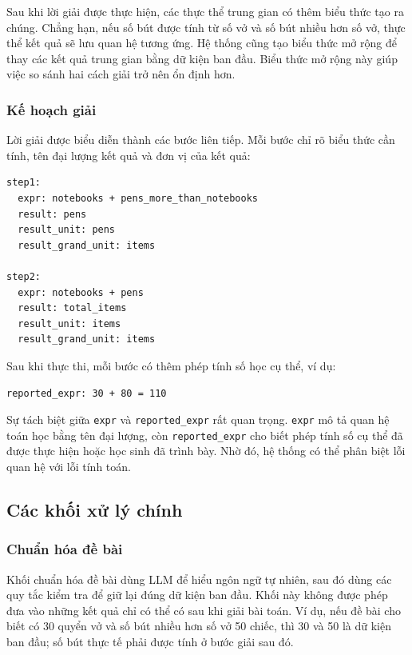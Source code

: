 \documentclass[12pt,a4paper]{article}
\begin{document}
Sau khi lời giải được thực hiện, các thực thể trung gian có thêm biểu thức tạo
ra chúng. Chẳng hạn, nếu số bút được tính từ số vở và số bút nhiều hơn số vở,
thực thể kết quả sẽ lưu quan hệ tương ứng. Hệ thống cũng tạo biểu thức mở rộng
để thay các kết quả trung gian bằng dữ kiện ban đầu. Biểu thức mở rộng này giúp
việc so sánh hai cách giải trở nên ổn định hơn.

\subsubsection{Kế hoạch giải}

Lời giải được biểu diễn thành các bước liên tiếp. Mỗi bước chỉ rõ biểu thức cần
tính, tên đại lượng kết quả và đơn vị của kết quả:

\begin{verbatim}
step1:
  expr: notebooks + pens_more_than_notebooks
  result: pens
  result_unit: pens
  result_grand_unit: items

step2:
  expr: notebooks + pens
  result: total_items
  result_unit: items
  result_grand_unit: items
\end{verbatim}

Sau khi thực thi, mỗi bước có thêm phép tính số học cụ thể, ví dụ:

\begin{verbatim}
reported_expr: 30 + 80 = 110
\end{verbatim}

Sự tách biệt giữa \texttt{expr} và \texttt{reported\_expr} rất quan trọng.
\texttt{expr} mô tả quan hệ toán học bằng tên đại lượng, còn
\texttt{reported\_expr} cho biết phép tính số cụ thể đã được thực hiện hoặc học
sinh đã trình bày. Nhờ đó, hệ thống có thể phân biệt lỗi quan hệ với lỗi tính
toán.

\subsection{Các khối xử lý chính}

\subsubsection{Chuẩn hóa đề bài}

Khối chuẩn hóa đề bài dùng LLM để hiểu ngôn ngữ tự nhiên, sau đó dùng các quy
tắc kiểm tra để giữ lại đúng dữ kiện ban đầu. Khối này không được phép đưa vào
những kết quả chỉ có thể có sau khi giải bài toán. Ví dụ, nếu đề bài cho biết có
30 quyển vở và số bút nhiều hơn số vở 50 chiếc, thì 30 và 50 là dữ kiện ban đầu;
số bút thực tế phải được tính ở bước giải sau đó.
\end{document}
